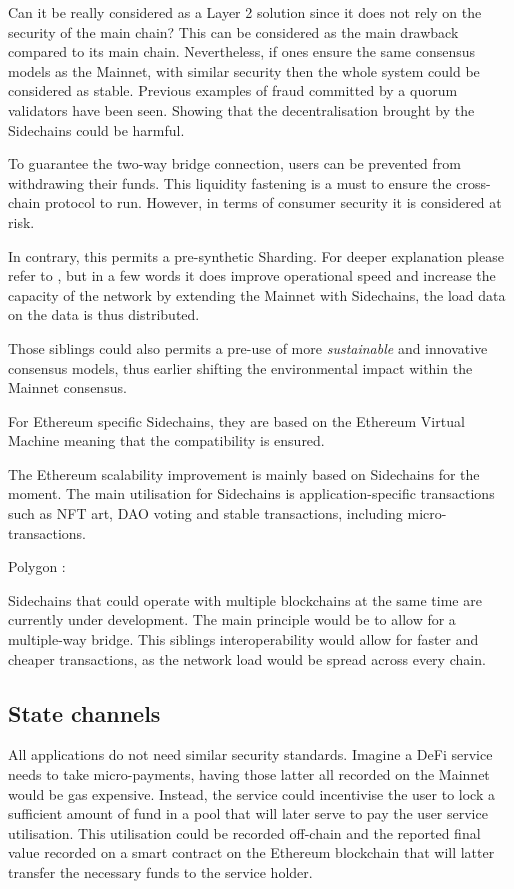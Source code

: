 Can it be really considered as a Layer 2 solution since it does not rely on the security of the main chain? This can be considered as the main drawback compared to its main chain. Nevertheless, if ones ensure the same consensus models as the Mainnet, with similar security then the whole system could be considered as stable. Previous examples of fraud committed by a quorum validators have been seen. Showing that the decentralisation brought by the Sidechains could be harmful.

To guarantee the two-way bridge connection, users can be prevented from withdrawing their funds. This liquidity fastening is a must to ensure the cross-chain protocol to  run.  However, in terms of consumer security it is considered at risk.

In contrary, this permits a pre-synthetic Sharding. For deeper explanation please refer to \cite{XXX}, but in a few words it does improve operational speed and increase the capacity of the network by extending the Mainnet with Sidechains, the load data on the data is thus distributed.

Those siblings could also permits a pre-use of more \textit{sustainable} and innovative consensus models, thus earlier shifting the environmental impact within the Mainnet consensus.

For Ethereum specific Sidechains, they are based on the Ethereum Virtual Machine meaning that the compatibility is ensured.


The Ethereum scalability improvement is mainly based on Sidechains for the moment. The main utilisation for Sidechains is application-specific transactions such as NFT art, DAO voting and stable transactions, including micro-transactions.

Polygon : 

Sidechains that could operate with multiple blockchains at the same time are currently under development. The main principle would be to allow for a multiple-way bridge. This siblings interoperability would allow for faster and cheaper transactions, as the network load would be spread across every chain.


\subsection{State channels}

All applications do not need similar security standards. Imagine a DeFi service needs to take micro-payments, having those latter all recorded on the Mainnet would be gas expensive. Instead, the service could incentivise the user to lock a sufficient amount of fund in a pool that will later serve to pay the user service utilisation. This utilisation could be recorded off-chain and the reported final value recorded on a smart contract on the Ethereum blockchain that will latter transfer the necessary funds to the service holder.

